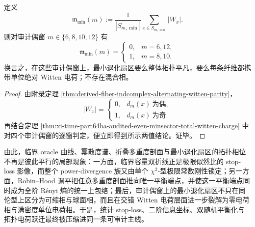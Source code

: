 \begin{corollary}[最小退化扇区的非平凡拓扑质量密度在审计偶窗上仅取两值 \(0\) 与 \(1\)]\label{cor:xi-time-part64ba-audited-even-minsector-topological-mass-density}
定义
\[
\mathfrak m_{\min}(m)
:=
\frac{1}{|S_{m,\min}|}\sum_{x\in S_{m,\min}}|W_x|.
\]
则对审计偶窗 \(m\in\{6,8,10,12\}\) 有
\[
\boxed{\;
\mathfrak m_{\min}(m)=
\begin{cases}
0,& m=6,12,\\[1mm]
1,& m=8,10.
\end{cases}\;}
\]
换言之，在这些审计偶窗上，最小退化扇区要么整体拓扑平凡，要么每条纤维都携带单位绝对 Witten 电荷；不存在混合相。
\end{corollary}
\begin{proof}
由附录定理 \ref{thm:derived-fiber-indcomplex-alternating-witten-parity}，
\[
|W_x|=
\begin{cases}
0,& d_m(x)\ \text{为偶},\\[1mm]
1,& d_m(x)\ \text{为奇}.
\end{cases}
\]
再结合定理 \ref{thm:xi-time-part64ba-audited-even-minsector-total-witten-charge} 中对四个审计偶窗的逐窗判定，便立即得到所示两值结论。证毕。
\end{proof}

\noindent
由此，临界 oracle 曲线、幂散度谱、折叠多重度剖面与最小退化扇区的拓扑相位不再是彼此平行的局部现象：一方面，临界容量双折线正是极限似然比的 stop-loss 影像，而整个 power-divergence 族又由单个 \(\chi^2\)-型极限常数刚性锁定；另一方面，Robin--Hood 调平把任意多重度剖面推向唯一平衡端点，并使这一平衡端点同时成为全阶 Rényi 熵的统一上包络；最后，审计偶窗上的最小退化扇区不只在同伦型上区分为可缩相与球面相，而且在交错 Witten 电荷层面进一步裂解为零电荷相与满密度单位电荷相。于是，统计 stop-loss、二阶信息坐标、双随机平衡化与拓扑电荷跃迁最终被压缩进同一条可审计主线。

\endinput

